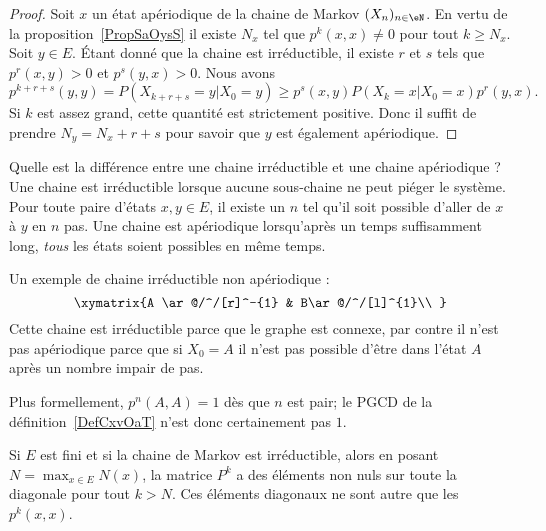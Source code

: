 \begin{proof}
	Soit \( x\) un état apériodique de la chaine de Markov \( (X_n)_{n\in \eN}\). En vertu de la proposition~\ref{PropSaOysS} il existe \( N_x\) tel que \( p^k(x,x)\neq 0\) pour tout \( k\geq N_x\). Soit \( y\in E\). Étant donné que la chaine est irréductible, il existe \( r\) et \( s\) tels que\( p^r(x,y)>0\) et \( p^s(y,x)>0\). Nous avons
	\begin{equation}
		p^{k+r+s}(y,y)=P(X_{k+r+s}=y|X_0=y)\geq p^s(x,y)P(X_k=x|X_0=x)p^r(y,x).
	\end{equation}
	Si \( k\) est assez grand, cette quantité est strictement positive. Donc il suffit de prendre \( N_y=N_x+r+s\) pour savoir que \( y\) est également apériodique.
\end{proof}

\begin{example}
	Quelle est la différence entre une chaine irréductible et une chaine apériodique ? Une chaine est irréductible lorsque aucune sous-chaine ne peut piéger le système. Pour toute paire d'états \( x,y\in E\), il existe un \( n\) tel qu'il soit possible d'aller de \( x\) à \( y\) en \( n\) pas. Une chaine est apériodique lorsqu'après un temps suffisamment long, \emph{tous} les états soient possibles en même temps.

	Un exemple de chaine irréductible non apériodique :
	\begin{equation}
		\xymatrix{%
		A \ar@/^/[r]^-{1}    &   B\ar@/^/[l]^{1}\\
		}
	\end{equation}
	Cette chaine est irréductible parce que le graphe est connexe, par contre il n'est pas apériodique parce que si \( X_0=A\) il n'est pas possible d'être dans l'état \( A\) après un nombre impair de pas.

	Plus formellement, \( p^n(A,A)=1\) dès que \( n\) est pair; le PGCD de la définition~\ref{DefCxvOaT} n'est donc certainement pas \( 1\).
\end{example}

Si \( E\) est fini et si la chaine de Markov est irréductible, alors en posant \( N=\max_{x\in E}N(x)\), la matrice \( P^k\) a des éléments non nuls sur toute la diagonale pour tout \( k>N\). Ces éléments diagonaux ne sont autre que les \( p^k(x,x)\).

